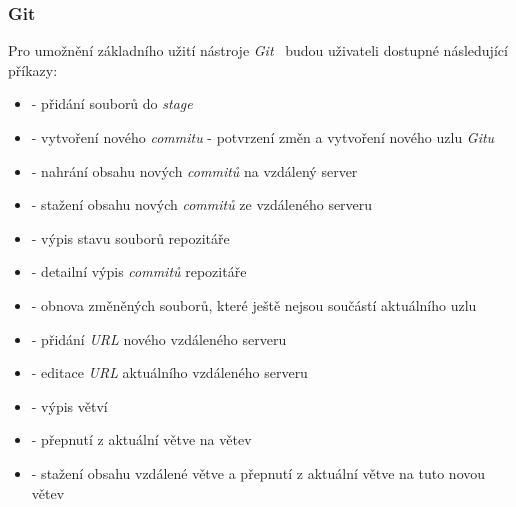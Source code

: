        \subsubsection{Git}
        Pro umožnění základního užití nástroje \emph{Git}~ budou uživateli dostupné následující příkazy:
        \begin{itemize}
            \item \textbf{} - přidání souborů do \emph{stage}
            \item \textbf{} - vytvoření nového \emph{commitu} - potvrzení změn a vytvoření nového uzlu \emph{Gitu}
            \item \textbf{} - nahrání obsahu nových \emph{commitů} na vzdálený server
            \item \textbf{} - stažení obsahu nových \emph{commitů} ze vzdáleného serveru
            \item \textbf{} - výpis stavu souborů repozitáře
            \item \textbf{} - detailní výpis \emph{commitů} repozitáře
            \item \textbf{} - obnova změněných souborů, které ještě nejsou součástí aktuálního uzlu
            \item \textbf{} - přidání \emph{URL} nového vzdáleného serveru
            \item \textbf{} - editace \emph{URL} aktuálního vzdáleného serveru
            \item \textbf{} - výpis větví
            \item \textbf{} - přepnutí z aktuální větve na větev 
            \item \textbf{} - stažení obsahu vzdálené větve a přepnutí z aktuální větve na tuto novou větev
        \end{itemize}


